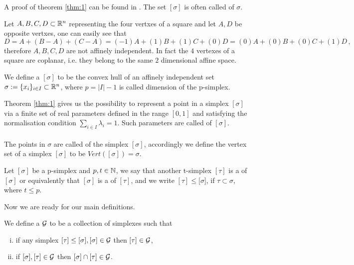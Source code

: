 \documentclass[../1.tex]{subfiles}
\begin{document}
    A proof of theorem \ref{thm:1} can be found in \cite{singerthorpe}.
    The set $[\sigma]$ is often called  of $\sigma$.
    
    \begin{exa}
        Let ${A,B,C,D} \subset \mathbb{R}^n$ representing the four vertxes of a square and let $A,D$ be opposite vertxes, one can easily see that 
        \[ D = A + (B-A) + (C-A) = (-1)A + (1)B + (1)C + (0)D = (0)A + (0)B + (0)C + (1)D \, ,\]
        therefore $A,B,C,D$ are not affinely independent.
        In fact the $4$ vertexes of a square are coplanar, i.e. they belong to the same $2$ dimensional affine space.
    \end{exa}


    \begin{defn}
        We define a  $[\sigma]$ to be the convex hull of an affinely independent set $\sigma := \{x_i\}_{i \in I} \subset \mathbb{R}^n$,
        where $p = |I|-1$ is called dimension of the p-simplex. 
    \end{defn}

    Theorem \ref{thm:1} gives us the possibility to represent a point in a simplex $[\sigma]$ via a finite set of real parameters defined in the range $[0,1]$
    and satisfying the normalisation condition $\sum_{i \in I } \lambda_i = 1$. Such parameters are called  of $[\sigma]$.\\
    \hfill \\
    The points in $\sigma$ are called  of the simplex $[\sigma]$, accordingly we define the vertex set of a simplex $[\sigma]$ to be 
    $Vert([\sigma]) = \sigma$.
    
    \begin{defn}
        Let $[\sigma]$ be a p-simplex and $p,t \in \mathbb{N}$, we say that another t-simplex $[\tau]$ is a  of $[\sigma]$ or equivalently 
        that $[\sigma]$ is a  of $[\tau]$, and we write $[\tau] \leq [\sigma$], if $\tau \subset \sigma$, where $t \leq p$.
    \end{defn}

    Now we are ready for our main definitions.
    
    \begin{defn}
        We define a  $\mathcal{G}$ to be a collection of simplexes such that
        \begin{enumerate}[(i)]
            \item if any simplex $ [\tau] \leq [\sigma], [\sigma] \in \mathcal{G}$ then $ [\tau] \in \mathcal{G}$,
            \item if $ [\sigma], [\tau] \in \mathcal{G}$ then $[\sigma] \cap [\tau] \in \mathcal{G}$.
        \end{enumerate}
    \end{defn}
\end{document}
